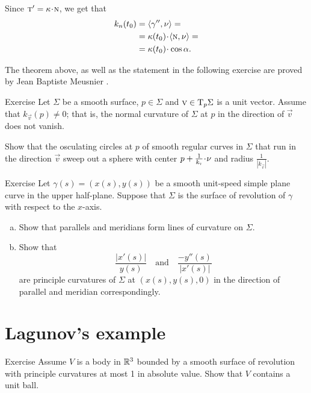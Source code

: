  Since $\tan'=\kur\cdot \norm$, we get that
\begin{align*}
k_{n}(t_0)&=\langle\gamma'',\Norm\rangle=
\\
&=\kur(t_0)\cdot\langle\norm,\Norm\rangle=
\\
&=\kur(t_0)\cdot\cos\alpha.
\end{align*}
\qedsf

The theorem above, as well as the statement in the following exercise are proved by Jean Baptiste Meusnier \cite{meusnier}.

\begin{thm}{Exercise}\label{ex:meusnier}
Let $\Sigma$ be a smooth surface, $p\in\Sigma$ and ${\textsc v}\in \mathrm{T}_p\Sigma$ is a unit vector.
Assume that $k_{\vec v}(p)\ne 0$; that is, the normal curvature of $\Sigma$ at $p$ in the direction of ${\vec v}$ does not vanish.

Show that the osculating circles at $p$ of smooth regular curves in $\Sigma$ that run in the direction ${\vec v}$ sweep out a sphere with center $p+\tfrac1{k_{\vec v}}\cdot\Norm$ and radius $\tfrac1{|k_{\vec v}|}$.
\end{thm}

\begin{thm}{Exercise}\label{ex:principle-revolution}
Let $\gamma(s)=(x(s),y(s))$ be a smooth unit-speed simple plane curve in the upper half-plane.
Suppose that $\Sigma$ is the surface of revolution of $\gamma$ with respect to the $x$-axis.

\begin{enumerate}[(a)]
\item Show that parallels and meridians form lines of curvature on $\Sigma$.
\item Show that 
\[\frac{|x'(s)|}{y(s)}
\quad
\text{and}
\quad
\frac{-y''(s)}{|x'(s)|}
\]
are principle curvatures of $\Sigma$ at $(x(s),y(s),0)$ in the direction of parallel and meridian correspondingly.
\end{enumerate}

\end{thm}

\section*{Lagunov's example}

\begin{thm}{Exercise}\label{ex:moon-revolution}
Assume $V$ is a body in $\mathbb{R}^3$ bounded by a smooth surface of revolution with principle curvatures at most 1 in absolute value.
Show that $V$ contains a unit ball.
\end{thm}

